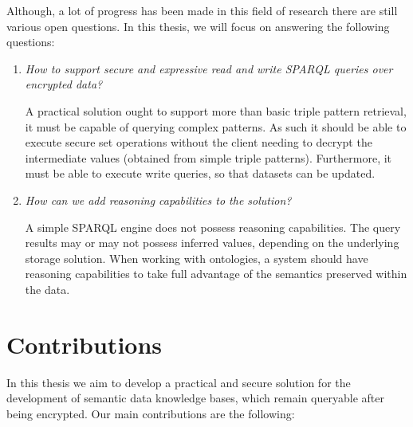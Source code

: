 Although, a lot of progress has been made in this field of research there are still various open questions. In this thesis, we will focus on answering the following questions:

\begin{enumerate}
    \item \emph{How to support secure and expressive read and write \gls{SPARQL} queries over encrypted data?}
    
    A practical solution ought to support more than basic triple pattern retrieval, it must be capable of querying complex patterns. As such it should be able to execute secure set operations without the client needing to decrypt the intermediate values (obtained from simple triple patterns). Furthermore, it must be able to execute write queries, so that datasets can be updated. 

    \item \emph{How can we add reasoning capabilities to the solution?}
    
    A simple \gls{SPARQL} engine does not possess reasoning capabilities. The query results may or may not possess inferred values, depending on the underlying storage solution. When working with ontologies, a system should have reasoning capabilities to take full advantage of the semantics preserved within the data.
\end{enumerate}


\section{Contributions}
\label{ch1:sec:contributions}

In this thesis we aim to develop a practical and secure solution for the development of semantic data knowledge bases, which remain queryable after being encrypted. Our main contributions are the following:


